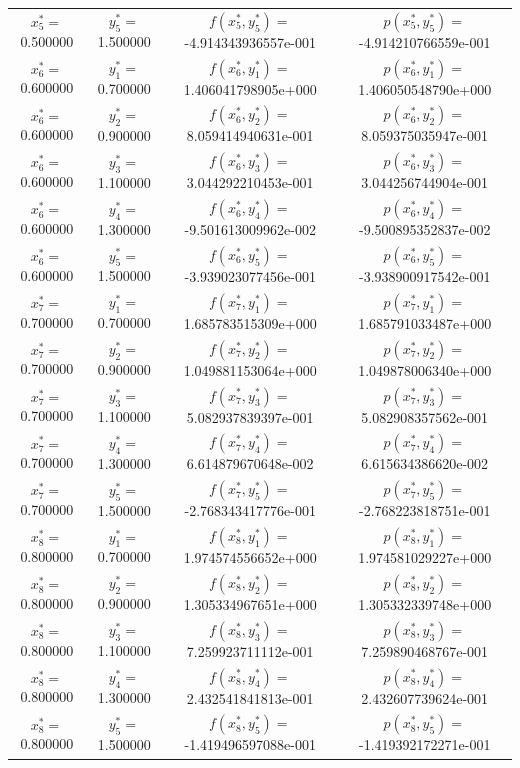 \begin{longtable}{cccc}
$x_{5}^{\ast}=$0.500000 & $y_{5}^{\ast}=$1.500000 & $f(x_{5}^{\ast},y_{5}^{\ast})=$-4.914343936557e-001 &$p(x_{5}^{\ast},y_{5}^{\ast})=$-4.914210766559e-001 \\
$x_{6}^{\ast}=$0.600000 & $y_{1}^{\ast}=$0.700000 & $f(x_{6}^{\ast},y_{1}^{\ast})=$1.406041798905e+000 &$p(x_{6}^{\ast},y_{1}^{\ast})=$1.406050548790e+000 \\
$x_{6}^{\ast}=$0.600000 & $y_{2}^{\ast}=$0.900000 & $f(x_{6}^{\ast},y_{2}^{\ast})=$8.059414940631e-001 &$p(x_{6}^{\ast},y_{2}^{\ast})=$8.059375035947e-001 \\
$x_{6}^{\ast}=$0.600000 & $y_{3}^{\ast}=$1.100000 & $f(x_{6}^{\ast},y_{3}^{\ast})=$3.044292210453e-001 &$p(x_{6}^{\ast},y_{3}^{\ast})=$3.044256744904e-001 \\
$x_{6}^{\ast}=$0.600000 & $y_{4}^{\ast}=$1.300000 & $f(x_{6}^{\ast},y_{4}^{\ast})=$-9.501613009962e-002 &$p(x_{6}^{\ast},y_{4}^{\ast})=$-9.500895352837e-002 \\
$x_{6}^{\ast}=$0.600000 & $y_{5}^{\ast}=$1.500000 & $f(x_{6}^{\ast},y_{5}^{\ast})=$-3.939023077456e-001 &$p(x_{6}^{\ast},y_{5}^{\ast})=$-3.938900917542e-001 \\
$x_{7}^{\ast}=$0.700000 & $y_{1}^{\ast}=$0.700000 & $f(x_{7}^{\ast},y_{1}^{\ast})=$1.685783515309e+000 &$p(x_{7}^{\ast},y_{1}^{\ast})=$1.685791033487e+000 \\
$x_{7}^{\ast}=$0.700000 & $y_{2}^{\ast}=$0.900000 & $f(x_{7}^{\ast},y_{2}^{\ast})=$1.049881153064e+000 &$p(x_{7}^{\ast},y_{2}^{\ast})=$1.049878006340e+000 \\
$x_{7}^{\ast}=$0.700000 & $y_{3}^{\ast}=$1.100000 & $f(x_{7}^{\ast},y_{3}^{\ast})=$5.082937839397e-001 &$p(x_{7}^{\ast},y_{3}^{\ast})=$5.082908357562e-001 \\
$x_{7}^{\ast}=$0.700000 & $y_{4}^{\ast}=$1.300000 & $f(x_{7}^{\ast},y_{4}^{\ast})=$6.614879670648e-002 &$p(x_{7}^{\ast},y_{4}^{\ast})=$6.615634386620e-002 \\
$x_{7}^{\ast}=$0.700000 & $y_{5}^{\ast}=$1.500000 & $f(x_{7}^{\ast},y_{5}^{\ast})=$-2.768343417776e-001 &$p(x_{7}^{\ast},y_{5}^{\ast})=$-2.768223818751e-001 \\
$x_{8}^{\ast}=$0.800000 & $y_{1}^{\ast}=$0.700000 & $f(x_{8}^{\ast},y_{1}^{\ast})=$1.974574556652e+000 &$p(x_{8}^{\ast},y_{1}^{\ast})=$1.974581029227e+000 \\
$x_{8}^{\ast}=$0.800000 & $y_{2}^{\ast}=$0.900000 & $f(x_{8}^{\ast},y_{2}^{\ast})=$1.305334967651e+000 &$p(x_{8}^{\ast},y_{2}^{\ast})=$1.305332339748e+000 \\
$x_{8}^{\ast}=$0.800000 & $y_{3}^{\ast}=$1.100000 & $f(x_{8}^{\ast},y_{3}^{\ast})=$7.259923711112e-001 &$p(x_{8}^{\ast},y_{3}^{\ast})=$7.259890468767e-001 \\
$x_{8}^{\ast}=$0.800000 & $y_{4}^{\ast}=$1.300000 & $f(x_{8}^{\ast},y_{4}^{\ast})=$2.432541841813e-001 &$p(x_{8}^{\ast},y_{4}^{\ast})=$2.432607739624e-001 \\
$x_{8}^{\ast}=$0.800000 & $y_{5}^{\ast}=$1.500000 & $f(x_{8}^{\ast},y_{5}^{\ast})=$-1.419496597088e-001 &$p(x_{8}^{\ast},y_{5}^{\ast})=$-1.419392172271e-001 \\
\end{longtable}

